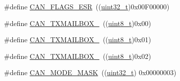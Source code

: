 \begin{DoxyCompactItemize}
\item 
\#define \hyperlink{group___c_a_n___private___defines_ga14f7bb0b320da21443c9bd60b1f86b5d}{C\+A\+N\+\_\+\+F\+L\+A\+G\+S\+\_\+\+E\+SR}~((\hyperlink{_p_e___types_8h_a33594304e786b158f3fb30289278f5af}{uint32\+\_\+t})0x00\+F00000)
\item 
\#define \hyperlink{group___c_a_n___private___defines_gaa62f09d0693681cb7576f61c93b7cf0f}{C\+A\+N\+\_\+\+T\+X\+M\+A\+I\+L\+B\+O\+X\+\_}~((\hyperlink{_p_e___types_8h_aba7bc1797add20fe3efdf37ced1182c5}{uint8\+\_\+t})0x00)
\item 
\#define \hyperlink{group___c_a_n___private___defines_ga4e20f0aac1ac940014a6c66971890943}{C\+A\+N\+\_\+\+T\+X\+M\+A\+I\+L\+B\+O\+X\+\_}~((\hyperlink{_p_e___types_8h_aba7bc1797add20fe3efdf37ced1182c5}{uint8\+\_\+t})0x01)
\item 
\#define \hyperlink{group___c_a_n___private___defines_ga8a842aa352d72321930cc963b26bf6d7}{C\+A\+N\+\_\+\+T\+X\+M\+A\+I\+L\+B\+O\+X\+\_}~((\hyperlink{_p_e___types_8h_aba7bc1797add20fe3efdf37ced1182c5}{uint8\+\_\+t})0x02)
\item 
\#define \hyperlink{group___c_a_n___private___defines_ga79094ce5a3a2f717140e8cc9b7c161b6}{C\+A\+N\+\_\+\+M\+O\+D\+E\+\_\+\+M\+A\+SK}~((\hyperlink{_p_e___types_8h_a33594304e786b158f3fb30289278f5af}{uint32\+\_\+t}) 0x00000003)
\end{DoxyCompactItemize}
